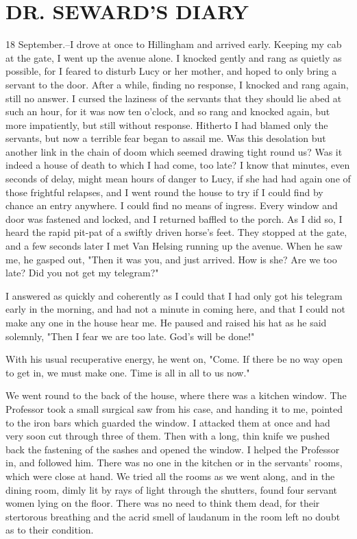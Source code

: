 \chapter{DR. SEWARD'S DIARY}

18 September.--I drove at once to Hillingham and arrived early. Keeping my cab at the gate, I went up the avenue alone. I knocked gently and rang as quietly as possible, for I feared to disturb Lucy or her mother, and hoped to only bring a servant to the door. After a while, finding no response, I knocked and rang again, still no answer. I cursed the laziness of the servants that they should lie abed at such an hour, for it was now ten o'clock, and so rang and knocked again, but more impatiently, but still without response. Hitherto I had blamed only the servants, but now a terrible fear began to assail me. Was this desolation but another link in the chain of doom which seemed drawing tight round us? Was it indeed a house of death to which I had come, too late? I know that minutes, even seconds of delay, might mean hours of danger to Lucy, if she had had again one of those frightful relapses, and I went round the house to try if I could find by chance an entry anywhere. I could find no means of ingress. Every window and door was fastened and locked, and I returned baffled to the porch. As I did so, I heard the rapid pit-pat of a swiftly driven horse's feet. They stopped at the gate, and a few seconds later I met Van Helsing running up the avenue. When he saw me, he gasped out, "Then it was you, and just arrived. How is she? Are we too late? Did you not get my telegram?" 

I answered as quickly and coherently as I could that I had only got his telegram early in the morning, and had not a minute in coming here, and that I could not make any one in the house hear me. He paused and raised his hat as he said solemnly, "Then I fear we are too late. God's will be done!" 

With his usual recuperative energy, he went on, "Come. If there be no way open to get in, we must make one. Time is all in all to us now." 

We went round to the back of the house, where there was a kitchen window. The Professor took a small surgical saw from his case, and handing it to me, pointed to the iron bars which guarded the window. I attacked them at once and had very soon cut through three of them. Then with a long, thin knife we pushed back the fastening of the sashes and opened the window. I helped the Professor in, and followed him. There was no one in the kitchen or in the servants' rooms, which were close at hand. We tried all the rooms as we went along, and in the dining room, dimly lit by rays of light through the shutters, found four servant women lying on the floor. There was no need to think them dead, for their stertorous breathing and the acrid smell of laudanum in the room left no doubt as to their condition. 

